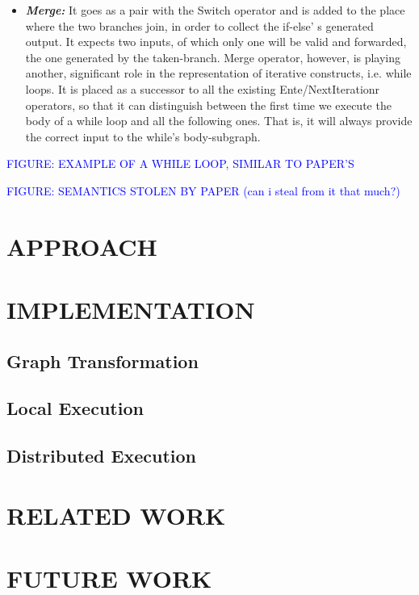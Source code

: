\documentclass[ack,preface]{dithesis}
\begin{document}
\begin{itemize}
    \item \textit{\textbf{Merge:}} It goes as a pair with the Switch operator and is added to the place where the two branches join, in order to collect the if-else' s generated output. It expects two inputs, of which only one will be valid and forwarded, the one generated by the taken-branch. Merge operator, however, is playing another, significant role in the representation of iterative constructs, i.e. while loops. It is placed as a successor to all the existing Ente/NextIterationr operators, so that it can distinguish between the first time we execute the body of a while loop and all the following ones. That is, it will always provide the correct input to the while's body-subgraph.

    \end{itemize}




\textcolor{blue}{FIGURE: EXAMPLE OF A WHILE LOOP, SIMILAR TO PAPER'S}

\textcolor{blue}{FIGURE: SEMANTICS STOLEN BY PAPER (can i steal from it that much?)}

\chapter{APPROACH}

\chapter{IMPLEMENTATION}
    \section{Graph Transformation}

    \section{Local Execution}

    \section{Distributed Execution}

\chapter{RELATED WORK}

\chapter{FUTURE WORK}
 
\end{document}
